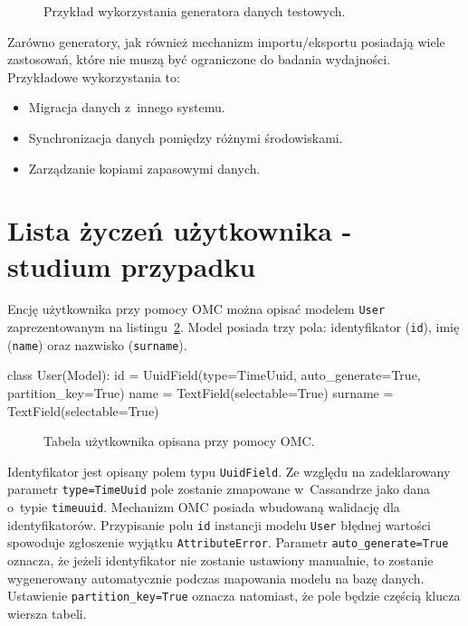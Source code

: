 \begin{figure}[ht!]
	\centering
	\theverbbox
	\caption{Przykład wykorzystania generatora danych testowych.}
	\label{vrb:test_data_generator}
\end{figure}

Zarówno generatory, jak również mechanizm importu/eksportu posiadają wiele zastosowań, które nie muszą być ograniczone do badania wydajności. Przykładowe wykorzystania to:

\begin{itemize}
	\item Migracja danych z~innego systemu.
	\item Synchronizacja danych pomiędzy różnymi środowiskami.
	\item Zarządzanie kopiami zapasowymi danych.
\end{itemize}

\section{Lista życzeń użytkownika - studium przypadku}

Encję użytkownika przy pomocy OMC można opisać modelem \verb+User+ zaprezentowanym na listingu~\ref{lst:omc_user_definition}. Model posiada trzy pola: identyfikator (\verb+id+), imię (\verb+name+) oraz nazwisko (\verb+surname+).

\begin{verbbox}[\footnotesize]
class User(Model):
    id = UuidField(type=TimeUuid, auto_generate=True, partition_key=True)
    name = TextField(selectable=True)
    surname = TextField(selectable=True)
\end{verbbox}

\begin{figure}[ht!]
	\centering
	\theverbbox
	\caption{Tabela użytkownika opisana przy pomocy OMC.}
	\label{lst:omc_user_definition}
\end{figure}

Identyfikator jest opisany polem typu \verb+UuidField+. Ze względu na zadeklarowany parametr \verb+type=TimeUuid+ pole zostanie zmapowane w~Cassandrze jako dana o~typie \verb+timeuuid+. Mechanizm OMC posiada wbudowaną walidację dla identyfikatorów. Przypisanie polu \verb+id+ instancji modelu \verb+User+ błędnej wartości spowoduje zgłoszenie wyjątku \verb+AttributeError+. Parametr \verb+auto_generate=True+ oznacza, że jeżeli identyfikator nie zostanie ustawiony manualnie, to zostanie wygenerowany automatycznie podczas mapowania modelu na bazę danych. Ustawienie \verb+partition_key=True+ oznacza natomiast, że pole będzie częścią klucza wiersza tabeli. 

